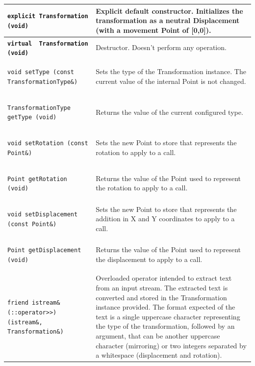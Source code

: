 \documentclass[11pt,twoside,openany,x11names,svgnames]{memoir}
\begin{document}
\begin{table}[h]\footnotesize
\centering
\begin{tabular}{| >{\bfseries}p{11cm} | p{4.5cm} |}
	\hline
	
	\texttt{explicit Transformation (void)} & Explicit default constructor. Initializes the transformation as a neutral Displacement (with a movement Point of [0,0]). \\
	
	\hline
	
	\texttt{virtual ~Transformation (void)} & Destructor. Doesn't perform any operation. \\
	
	\hline
	
	\texttt{void setType (const TransformationType\&)} & Sets the type of the Transformation instance. The current value of the internal Point is not changed. \\
	
	\hline	
	
	\texttt{TransformationType getType (void)} & Returns the value of the current configured type. \\
	
	\hline
	
	\texttt{void setRotation (const Point\&)} & Sets the new Point to store that represents the rotation to apply to a call. \\
	
	\hline	
	
	\texttt{Point getRotation (void)} & Returns the value of the Point used to represent the rotation to apply to a call. \\
	
	\hline
	
	\texttt{void setDisplacement (const Point\&)} & Sets the new Point to store that represents the addition in X and Y coordinates to apply to a call. \\
	
	\hline
	
	\texttt{Point getDisplacement (void)} & Returns the value of the Point used to represent the displacement to apply to a call. \\
	
	\hline
	
	\texttt{friend istream\& (::operator>>) (istream\&, Transformation\&)} & Overloaded operator intended to extract text from an input stream. The extracted text is converted and stored in the Transformation instance provided. The format expected of the text is a single uppercase character representing the type of the transformation, followed by an argument, that can be another uppercase character (mirroring) or two integers separated by a whitespace (displacement and rotation). \\
	

\end{tabular}
\end{table}
\end{document}

